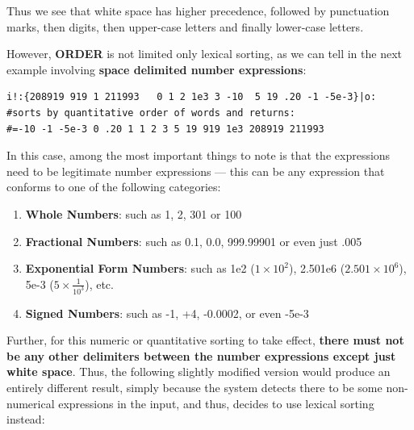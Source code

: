 \documentclass[a4paper, 18pt]{book} %
\begin{document}
{\vspace{2em}


Thus we see that white space has higher precedence, followed by punctuation marks, then digits, then upper-case letters and finally lower-case letters.


\vspace{2em}


However, \textbf{ORDER} is not limited only lexical sorting, as we can tell in the next example involving \textbf{space delimited number expressions}:

\vspace{2em}

  \begin{tcolorbox}[teaterminalstyle, title=O: EXAMPLE 5: Quantitatively Sort a list of number expressions, breakable]
  \begin{lstlisting}[language=TEA,breaklines=true,]
i!:{208919 919 1 211993   0 1 2 1e3 3 -10  5 19 .20 -1 -5e-3}|o:
#sorts by quantitative order of words and returns:
#=-10 -1 -5e-3 0 .20 1 1 2 3 5 19 919 1e3 208919 211993
   \end{lstlisting}
  \end{tcolorbox}


\vspace{1em}

In this case, among the most important things to note is that the expressions need to be legitimate number expressions --- this can be any expression that conforms to one of the following categories:

\begin{enumerate}
\item \textbf{Whole Numbers}: such as 1, 2, 301 or 100
\item \textbf{Fractional Numbers}: such as 0.1, 0.0, 999.99901 or even just .005
\item \textbf{Exponential Form Numbers}: such as 1e2 ($1 \times 10^2$), 2.501e6 ($2.501 \times 10^6$), 5e-3 ($5 \times \frac{1}{10^3}$), etc.
\item \textbf{Signed Numbers}: such as -1, +4, -0.0002, or even -5e-3
\end{enumerate}

\vspace{1em}

Further, for this numeric or quantitative sorting to take effect, \textbf{there must not be any other delimiters between the number expressions except just white space}. Thus, the following slightly modified version would produce an entirely different result, simply because the system detects there to be some non-numerical expressions in the input, and thus, decides to use lexical sorting instead:


}
\end{document}
